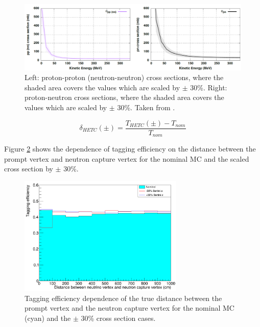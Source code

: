 \begin{figure}[!htb]
\centering
    \includegraphics[width=\textwidth]{Figures/pp_nn_xsec.PNG}
\caption{Left: proton-proton (neutron-neutron) cross sections, where the shaded area covers the values which are scaled by $\pm$ 30\%. Right: proton-neutron cross sections, where the shaded area covers the values which are scaled by $\pm$ 30\%. Taken from \cite{tn415_fiacob}.}
\label{fig:pp_nn_xsec}
\end{figure}



\begin{equation}
    \delta_{HETC }(\pm)=\frac{T_{HETC}(\pm)-T_{nom }}{T_{nom }}
\label{eq:HETC_uncertainty}
\end{equation}

Figure \ref{fig:HETC_taggeff_syst} shows the dependence of tagging efficiency on the distance between the prompt vertex and neutron capture vertex for the nominal MC and the scaled cross section by $\pm$ 30\%. 



\begin{figure}[!htb]
\centering
    \includegraphics[width=0.7\textwidth]{Figures/hetc_han_syst.PNG}
\caption{Tagging efficiency dependence of the true distance between the prompt vertex and the neutron capture vertex for the nominal MC (cyan) and the $\pm$ 30\% cross section cases.}
\label{fig:HETC_taggeff_syst}
\end{figure}

